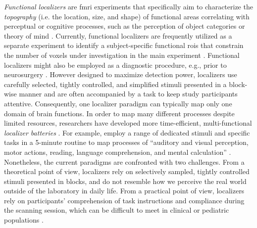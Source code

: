 \textit{Functional localizers} \citep[cf.][for reviews]{saxe2006divide,
friston2006critique} are \ac{fmri} experiments that specifically aim to
characterize the \textit{topography} (i.e. the location, size, and shape) of
functional areas correlating with perceptual or cognitive processes, such as the
perception of object categories \citep{kanwisher1997ffa} or theory of mind
\citep{spunt2014validating}.
Currently, functional localizers are frequently utilized as a separate
experiment to identify a subject-specific functional \acp{roi} that constrain
the number of voxels under investigation in the main experiment
\citep{poldrack2007region, saxe2006divide}.
Functional localizers might also be employed as a diagnostic procedure, e.g.,
prior to neurosurgery \citep[cf.][]{silva2018challenges,
szaflarski2017practice}.
However designed to maximize detection power, localizers use carefully selected,
tightly controlled, and simplified stimuli presented in a block-wise manner and
are often accompanied by a task to keep study participants attentive.
Consequently, one localizer paradigm can typically map only one domain of brain
functions.
In order to map many different processes despite limited resources, researchers
have developed more time-efficient, multi-functional \textit{localizer
batteries} \citep[e.g.,][]{barch2013function, drobyshevsky2006rapid,
pinho2018individual, pinho2020individual, pinel2007fast}.
For example, \citet{pinel2007fast} employ a range of dedicated stimuli and
specific tasks in a 5-minute routine to map processes of ``auditory and visual
perception, motor actions, reading, language comprehension, and mental
calculation'' \citep[][p. 15]{pinel2007fast}.
Nonetheless, the current paradigms are confronted with two challenges.
From a theoretical point of view, localizers rely on selectively sampled,
tightly controlled stimuli presented in blocks, and do not resemble how we
perceive the real world outside of the laboratory in daily life.
From a practical point of view, localizers rely on participants' comprehension
of task instructions and compliance during the scanning session, which can be
difficult to meet in clinical or pediatric populations
\citep{eickhoff2020towards, vanderwal2015inscapes, vanderwal2019movies}.


